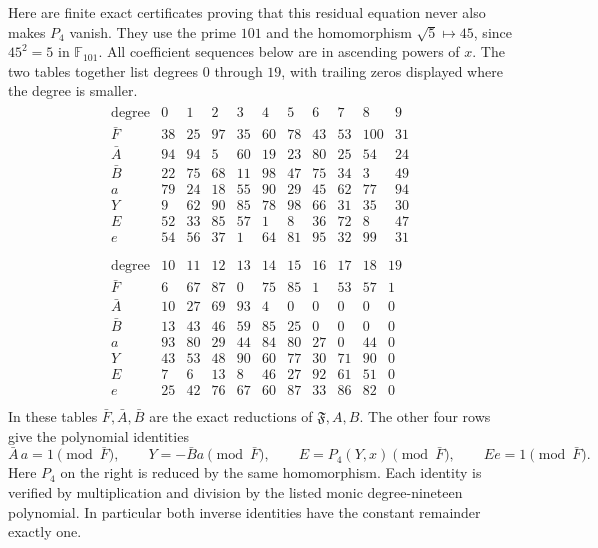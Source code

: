 \documentclass[11pt]{article}
\begin{document}
Here are finite exact certificates proving that this residual equation
never also makes $P_4$ vanish. They use the prime $101$ and the
homomorphism $\sqrt5\mapsto45$, since $45^2=5$ in $\mathbb F_{101}$.
All coefficient sequences below are in ascending powers of $x$.
The two tables together list degrees $0$ through $19$, with trailing
zeros displayed where the degree is smaller.
\[
\begin{gathered}
\begin{array}{c|rrrrrrrrrr}
\text{degree}&0&1&2&3&4&5&6&7&8&9\\\hline
\bar F&38&25&97&35&60&78&43&53&100&31\\
\bar A&94&94&5&60&19&23&80&25&54&24\\
\bar B&22&75&68&11&98&47&75&34&3&49\\
a&79&24&18&55&90&29&45&62&77&94\\
Y&9&62&90&85&78&98&66&31&35&30\\
E&52&33&85&57&1&8&36&72&8&47\\
e&54&56&37&1&64&81&95&32&99&31\\
\end{array}
\\[1ex]
\begin{array}{c|rrrrrrrrrr}
\text{degree}&10&11&12&13&14&15&16&17&18&19\\\hline
\bar F&6&67&87&0&75&85&1&53&57&1\\
\bar A&10&27&69&93&4&0&0&0&0&0\\
\bar B&13&43&46&59&85&25&0&0&0&0\\
a&93&80&29&44&84&80&27&0&44&0\\
Y&43&53&48&90&60&77&30&71&90&0\\
E&7&6&13&8&46&27&92&61&51&0\\
e&25&42&76&67&60&87&33&86&82&0\\
\end{array}
\end{gathered}
\tag{ANP17}
\]
In these tables $\bar F,\bar A,\bar B$ are the exact reductions
of $\mathfrak F,A,B$. The other four rows give the polynomial
identities
\[
 \bar A\,a=1\pmod{\bar F},\qquad
 Y=-\bar B a\pmod{\bar F},\qquad
 E=P_4(Y,x)\pmod{\bar F},\qquad E e=1\pmod{\bar F}.
 \tag{ANP11}
\]
Here $P_4$ on the right is reduced by the same homomorphism.
Each identity is verified by multiplication and division by the
listed monic degree-nineteen polynomial. In particular both inverse
identities have the constant remainder exactly one.
\end{document}
